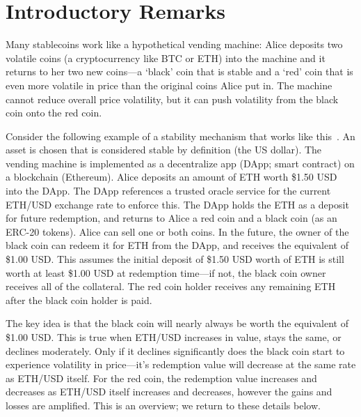 

\section{Introductory Remarks}

Many stablecoins work like a hypothetical vending machine: Alice deposits two volatile coins (\eg a cryptocurrency like BTC or ETH) into the machine and it returns to her two new coins---a `black' coin that is stable and a `red' coin that is even more volatile in price than the original coins Alice put in. The machine cannot reduce overall price volatility, but it can push volatility from the black coin onto the red coin. 

Consider the following example of a stability mechanism that works like this~\cite{CDM20}. An asset is chosen that is considered stable by definition (\eg the US dollar). The vending machine is implemented as a decentralize app (DApp; \aka smart contract) on a blockchain (\eg Ethereum). Alice deposits an amount of ETH worth \$1.50 USD into the DApp. The DApp references a trusted oracle service for the current ETH/USD exchange rate to enforce this. The DApp holds the ETH as a deposit for future redemption, and returns to Alice a red coin and a black coin (\eg as an ERC-20 tokens). Alice can sell one or both coins. In the future, the owner of the black coin can redeem it for ETH from the DApp, and receives the equivalent of \$1.00 USD. This assumes the initial deposit of \$1.50 USD worth of ETH is still worth at least \$1.00 USD at redemption time---if not, the black coin owner receives all of the collateral. The red coin holder receives any remaining ETH after the black coin holder is paid.

The key idea is that the black coin will nearly always be worth the equivalent of \$1.00 USD. This is true when ETH/USD increases in value, stays the same, or declines moderately. Only if it declines significantly does the black coin start to experience volatility in price---it's redemption value will decrease at the same rate as ETH/USD itself. For the red coin, the redemption value increases and decreases as ETH/USD itself increases and decreases, however the gains and losses are amplified. This is an overview; we return to these details below.

